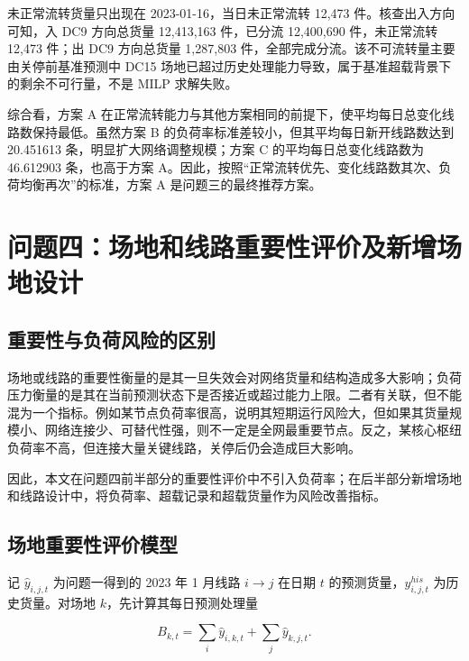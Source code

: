 \documentclass[UTF8,zihao=-4,a4paper,fontset=fandol]{ctexart}
\begin{document}
未正常流转货量只出现在 2023-01-16，当日未正常流转 12,473 件。核查出入方向可知，入 DC9 方向总货量 12,413,163 件，已分流 12,400,690 件，未正常流转 12,473 件；出 DC9 方向总货量 1,287,803 件，全部完成分流。该不可流转量主要由关停前基准预测中 DC15 场地已超过历史处理能力导致，属于基准超载背景下的剩余不可行量，不是 MILP 求解失败。



综合看，方案 A 在正常流转能力与其他方案相同的前提下，使平均每日总变化线路数保持最低。虽然方案 B 的负荷率标准差较小，但其平均每日新开线路数达到 20.451613 条，明显扩大网络调整规模；方案 C 的平均每日总变化线路数为 46.612903 条，也高于方案 A。因此，按照“正常流转优先、变化线路数其次、负荷均衡再次”的标准，方案 A 是问题三的最终推荐方案。



\section{问题四：场地和线路重要性评价及新增场地设计}



\subsection{重要性与负荷风险的区别}



场地或线路的重要性衡量的是其一旦失效会对网络货量和结构造成多大影响；负荷压力衡量的是其在当前预测状态下是否接近或超过能力上限。二者有关联，但不能混为一个指标。例如某节点负荷率很高，说明其短期运行风险大，但如果其货量规模小、网络连接少、可替代性强，则不一定是全网最重要节点。反之，某核心枢纽负荷率不高，但连接大量关键线路，关停后仍会造成巨大影响。



因此，本文在问题四前半部分的重要性评价中不引入负荷率；在后半部分新增场地和线路设计中，将负荷率、超载记录和超载货量作为风险改善指标。



\subsection{场地重要性评价模型}



记 $\hat y_{i,j,t}$ 为问题一得到的 2023 年 1 月线路 $i\to j$ 在日期 $t$ 的预测货量，$y_{i,j,t}^{his}$ 为历史货量。对场地 $k$，先计算其每日预测处理量



\begin{equation}
B_{k,t}=\sum_i \hat y_{i,k,t}+\sum_j \hat y_{k,j,t}.
\end{equation}
\end{document}
